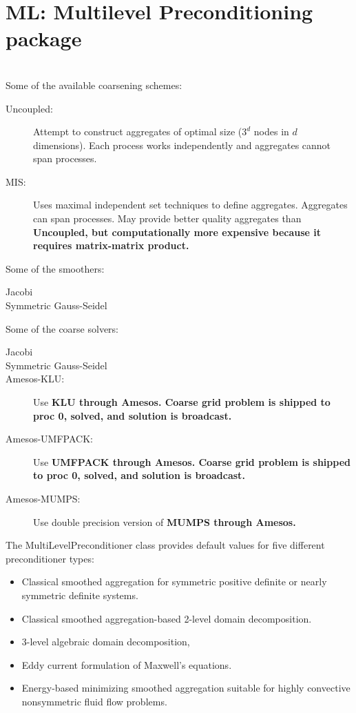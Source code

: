 \section{ML: Multilevel Preconditioning package}
\\
Some of the available coarsening schemes:
\begin{description}
\item [Uncoupled:] Attempt to construct aggregates of optimal size ($3^d$
nodes in $d$ dimensions). Each process works independently and aggregates
cannot span processes.
\item [MIS:] Uses maximal independent set techniques \cite{mis} to define
aggregates. Aggregates can span processes. May provide better quality
aggregates than \bf{Uncoupled}, but computationally more expensive because it
requires matrix-matrix product.
\end{description}
Some of the smoothers:
\begin{description}
\item [Jacobi]
\item [Symmetric Gauss-Seidel]
\end{description}
Some of the coarse solvers:
\begin{description}
\item [Jacobi]
\item [Symmetric Gauss-Seidel]
\item [Amesos-KLU:] Use \bf{KLU} through Amesos. Coarse grid problem is shipped to
proc 0, solved, and solution is broadcast.
\item [Amesos-UMFPACK:] Use \bf{UMFPACK} through Amesos. Coarse grid problem
is shipped to proc 0, solved, and solution is broadcast.
\item[Amesos-MUMPS:] Use double precision version of \bf{MUMPS} through
Amesos.
\end{description}
The MultiLevelPreconditioner class provides default values for five different
preconditioner types:
\begin{itemize}
\item Classical smoothed aggregation for symmetric positive definite or nearly
symmetric definite systems.
\item Classical smoothed aggregation-based 2-level domain decomposition.
\item 3-level algebraic domain decomposition,
\item Eddy current formulation of Maxwell's equations.
\item Energy-based minimizing smoothed aggregation suitable for highly
convective nonsymmetric fluid flow problems.
\end{itemize}
